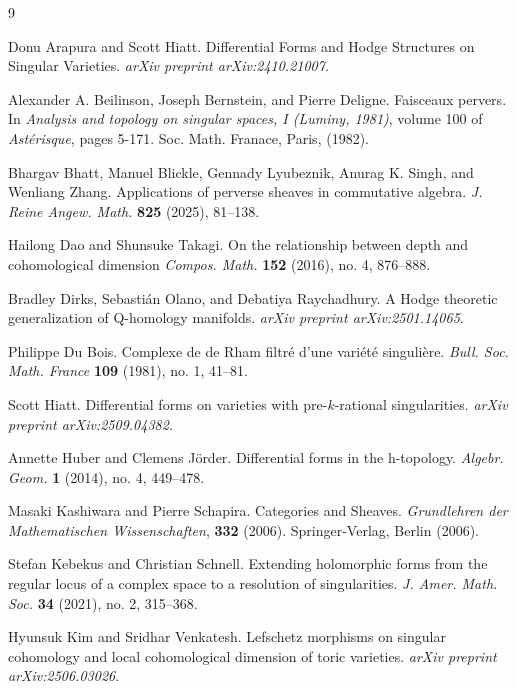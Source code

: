 \documentclass[11pt]{amsart}
\theoremstyle{definition}
\theoremstyle{plain}
\begin{document}
\begin{thebibliography}{9}

Donu Arapura and Scott Hiatt. Differential Forms and Hodge Structures on Singular Varieties. \emph{arXiv preprint arXiv:2410.21007}.

Alexander A. Beilinson, Joseph Bernstein, and Pierre Deligne. Faisceaux pervers.  In \emph{Analysis and topology on singular spaces, I (Luminy, 1981)}, volume 100 of \emph{Astérisque}, pages 5-171. Soc. Math. Franace, Paris, (1982).

Bhargav Bhatt, Manuel Blickle, Gennady Lyubeznik, Anurag K. Singh, and Wenliang Zhang. Applications of perverse sheaves in commutative algebra. \emph{J. Reine Angew. Math.} {\bf 825} (2025), 81--138.

Hailong Dao and Shunsuke Takagi. On the relationship between depth and cohomological dimension \emph{Compos. Math.} {\bf 152} (2016), no. 4, 876--888.

Bradley Dirks, Sebasti{\'a}n Olano, and Debatiya Raychadhury. A Hodge theoretic generalization of Q-homology manifolds. \emph{arXiv preprint arXiv:2501.14065}.

Philippe Du Bois. Complexe de de Rham filtr{\'e} d'une vari{\'e}t{\'e} singuli{\`e}re. \emph{Bull. Soc. Math. France} {\bf 109} (1981), no. 1, 41--81.

Scott Hiatt. Differential forms on varieties with pre-$k$-rational singularities. \emph{arXiv preprint arXiv:2509.04382}.

Annette Huber and Clemens J{\"o}rder. Differential forms in the h-topology. \emph{Algebr. Geom.} {\bf 1} (2014), no. 4, 449--478.

Masaki Kashiwara and Pierre Schapira. Categories and Sheaves. \emph{Grundlehren der Mathematischen Wissenschaften}, {\bf 332} (2006). Springer-Verlag, Berlin (2006).

Stefan Kebekus and Christian Schnell. Extending holomorphic forms from the regular locus of a complex space to a resolution of singularities. \emph{J. Amer. Math. Soc.} {\bf 34} (2021), no. 2, 315--368.

Hyunsuk Kim and Sridhar Venkatesh. Lefschetz morphisms on singular cohomology and local cohomological dimension of toric varieties. \emph{arXiv preprint arXiv:2506.03026}.


\end{thebibliography}
\end{document}
